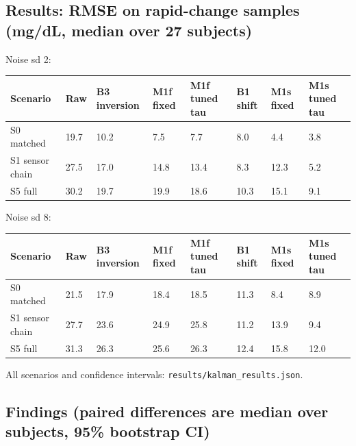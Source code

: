 \documentclass[11pt,a4paper]{article}
\begin{document}
\hypertarget{results-rmse-on-rapid-change-samples-mgdl-median-over-27-subjects}{%
\subsection{Results: RMSE on rapid-change samples (mg/dL, median over 27
subjects)}\label{results-rmse-on-rapid-change-samples-mgdl-median-over-27-subjects}}

Noise sd 2:

\begin{longtable}[]{@{}llllllll@{}}
\toprule\noalign{}
Scenario & Raw & B3 inversion & M1f fixed & M1f tuned tau & B1 shift &
M1s fixed & M1s tuned tau \\
\midrule\noalign{}
\endhead
\bottomrule\noalign{}
\endlastfoot
S0 matched & 19.7 & 10.2 & 7.5 & 7.7 & 8.0 & 4.4 & 3.8 \\
S1 sensor chain & 27.5 & 17.0 & 14.8 & 13.4 & 8.3 & 12.3 & 5.2 \\
S5 full & 30.2 & 19.7 & 19.9 & 18.6 & 10.3 & 15.1 & 9.1 \\
\end{longtable}

Noise sd 8:

\begin{longtable}[]{@{}llllllll@{}}
\toprule\noalign{}
Scenario & Raw & B3 inversion & M1f fixed & M1f tuned tau & B1 shift &
M1s fixed & M1s tuned tau \\
\midrule\noalign{}
\endhead
\bottomrule\noalign{}
\endlastfoot
S0 matched & 21.5 & 17.9 & 18.4 & 18.5 & 11.3 & 8.4 & 8.9 \\
S1 sensor chain & 27.7 & 23.6 & 24.9 & 25.8 & 11.2 & 13.9 & 9.4 \\
S5 full & 31.3 & 26.3 & 25.6 & 26.3 & 12.4 & 15.8 & 12.0 \\
\end{longtable}

All scenarios and confidence intervals:
\texttt{results/kalman\_results.json}.

\hypertarget{findings-paired-differences-are-median-over-subjects-95-bootstrap-ci}{%
\subsection{Findings (paired differences are median over subjects, 95\%
bootstrap
CI)}\label{findings-paired-differences-are-median-over-subjects-95-bootstrap-ci}}
\end{document}

